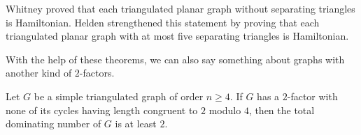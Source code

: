 \begin{remark}
  Whitney \cite{ham1} proved that each triangulated planar graph without separating
  triangles is Hamiltonian. Helden \cite{ham5} strengthened this statement by proving that
  each triangulated planar graph with at most five separating triangles is Hamiltonian.
\end{remark}

With the help of these theorems,
we can also say something about graphs with another kind of $2$-factors.

\begin{claim}
  Let $G$ be a simple triangulated graph of order $n \ge 4$. If $G$ has a $2$-factor
  with none of its cycles having length congruent to $2$ modulo $4$, then the total
  dominating number of $G$ is at least $2$.
\end{claim}


